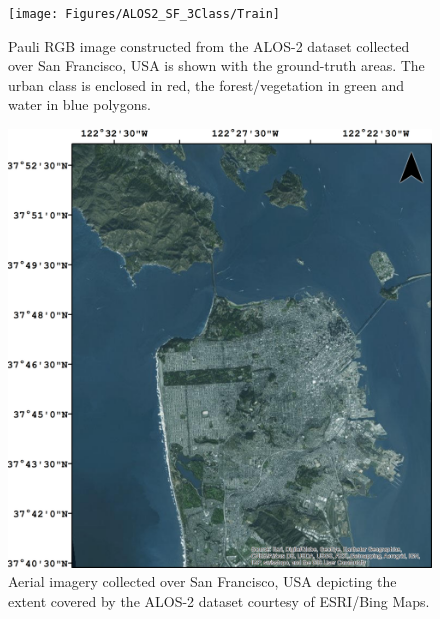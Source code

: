 \begin{figure}[tbp]
\centering
		\texttt{[image: Figures/ALOS2\_SF\_3Class/Train]}
		\caption{Pauli RGB image constructed from the ALOS-2 dataset collected over San Francisco, USA is shown with the ground-truth areas. The urban class is enclosed in red, the forest/vegetation in green and water in blue polygons.}
		\label{fig:train1alos2}
\end{figure}

\begin{figure}[tbp]
\centering
		\includegraphics[width=0.5\columnwidth]{Figures/SF}
		\caption{Aerial imagery collected over San Francisco, USA depicting the extent covered by the ALOS-2 dataset courtesy of ESRI/Bing Maps.}
		\label{fig:OpticalAlos2}
\end{figure}

